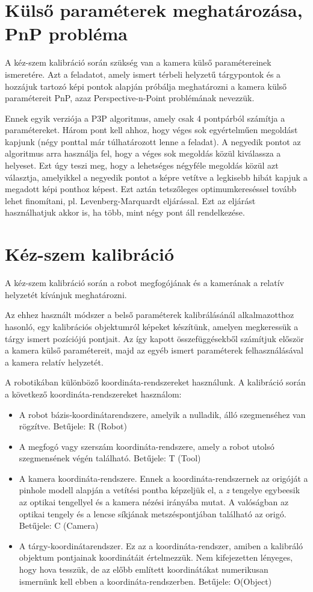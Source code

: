 \documentclass{article}
\begin{document}
	\section{Külső paraméterek meghatározása, PnP probléma}
	A kéz-szem kalibráció során szükség van a kamera külső paramétereinek ismeretére. Azt a feladatot, amely ismert térbeli helyzetű tárgypontok és a hozzájuk tartozó képi pontok alapján próbálja meghatározni a kamera külső paramétereit PnP, azaz Perspective-n-Point problémának nevezzük. 
	
Ennek egyik verziója a P3P algoritmus, amely csak 4 pontpárból számítja a paramétereket. Három pont kell ahhoz, hogy véges sok egyértelműen megoldást kapjunk (négy ponttal már túlhatározott lenne a feladat). A negyedik pontot az algoritmus arra használja fel, hogy a véges sok megoldás közül kiválassza a helyeset. Ezt úgy teszi meg, hogy a lehetséges négyféle megoldás közül azt választja, amelyikkel a negyedik pontot a képre vetítve a legkisebb hibát kapjuk a megadott képi ponthoz képest. Ezt aztán tetszőleges optimumkereséssel tovább lehet finomítani, pl. Levenberg-Marquardt eljárással. Ezt az eljárást használhatjuk akkor is, ha több, mint négy pont áll rendelkezése.
	
	\section{Kéz-szem kalibráció}
	A kéz-szem kalibráció során a robot megfogójának és a kamerának a relatív helyzetét kívánjuk meghatározni.

	Az ehhez használt módszer a belső paraméterek kalibrálásánál alkalmazotthoz hasonló, egy kalibrációs objektumról képeket készítünk, amelyen megkeressük a tárgy ismert pozíciójú pontjait. Az így kapott összefüggésekből számítjuk először a kamera külső paramétereit, majd az egyéb ismert paraméterek felhasználásával a kamera relatív helyzetét.	
	
	 A robotikában különböző koordináta-rendszereket használunk. A kalibráció során a következő koordináta-rendszereket használom:
	\begin{itemize}
	\item A robot bázis-koordinátarendszere, amelyik a nulladik, álló szegmenséhez van rögzítve. Betűjele: R (Robot)	
	\item A megfogó vagy szerszám koordináta-rendszere, amely a robot utolsó szegmensének végén található. Betűjele: T (Tool)
	\item A kamera koordináta-rendszere. Ennek a koordináta-rendszernek az origóját a pinhole modell alapján a vetítési pontba képzeljük el, a \textit{z} tengelye egybeesik az optikai tengellyel és a kamera nézési irányába mutat. A valóságban az optikai tengely és a lencse síkjának metszéspontjában található az origó. Betűjele: C (Camera)
	\item A tárgy-koordinátarendszer. Ez az a koordináta-rendszer, amiben a kalibráló objektum pontjainak koordinátáit értelmezzük. Nem kifejezetten lényeges, hogy hova tesszük, de az előbb említett koordinátákat numerikusan ismernünk kell ebben a koordináta-rendszerben. Betűjele: O(Object)
	\end{itemize}
	
\end{document}
